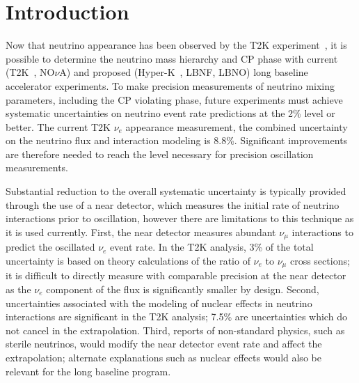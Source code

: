 \section{Introduction \label{sec:intro}}


Now that neutrino appearance has been observed by the T2K experiment~\cite{t2knue}, it is possible to determine the 
neutrino mass hierarchy and CP phase with current (T2K~\cite{Abe:2014tzr}, NO$\nu$A)  and proposed (Hyper-K~\cite{Abe:2011ts},
 LBNF, LBNO) long baseline 
accelerator experiments.  To make precision measurements of neutrino mixing parameters, including the CP violating phase, 
future experiments must achieve systematic uncertainties on neutrino event rate predictions at the 2\% level or better.  
The current T2K $\nu_{e}$ appearance measurement, the combined uncertainty on the neutrino flux and interaction modeling is 8.8\%.  
Significant improvements are therefore needed to reach the level necessary for precision oscillation measurements.

Substantial reduction to the overall systematic uncertainty is typically provided through the use of a near detector, 
which measures the initial rate of neutrino interactions prior to oscillation, however there are limitations to this technique 
as it is used currently.  First, the near detector measures abundant $\nu_\mu$ interactions to predict the oscillated $\nu_{e}$ 
event rate. In the T2K analysis, 3\% of the total uncertainty is based on theory calculations of the ratio of $\nu_{e}$ to $\nu_{\mu}$ 
cross sections; it is difficult to directly measure with comparable precision at the near detector as the $\nu_{e}$ component of 
the flux is significantly smaller by design. Second, uncertainties associated with the modeling of nuclear effects in neutrino 
interactions are significant in the T2K analysis; 7.5\% are uncertainties which do not cancel in the extrapolation. Third, 
reports of non-standard physics, such as sterile neutrinos, would modify the near detector event rate and affect the 
extrapolation; alternate explanations such as nuclear effects would also be relevant for the long baseline program.

